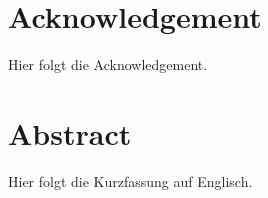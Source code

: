 \chapter*{Acknowledgement}
Hier folgt die Acknowledgement.

\newpage
\chapter*{Abstract}
Hier folgt die Kurzfassung auf Englisch.
